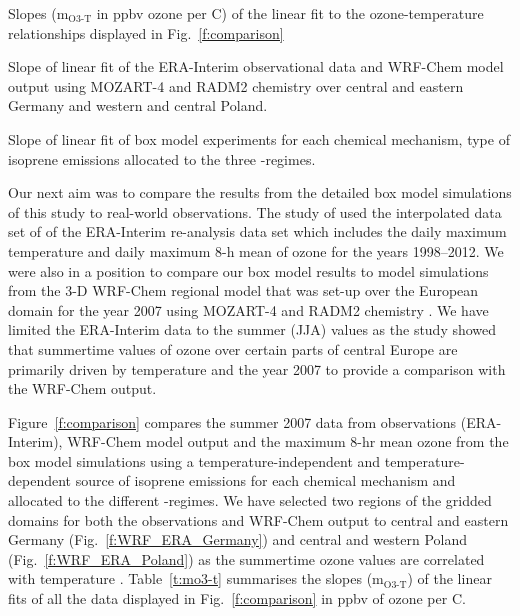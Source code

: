 \begin{table}[t]%
    \centering%
    \caption{Slopes (m$_{\text{O3-T}}$ in ppbv ozone per \degree C) of the linear fit to the ozone-temperature relationships displayed in Fig.~\ref{f:comparison}}%
    \label{t:mo3-t}%
    \begin{subtable}[t]{\textwidth}%
        \centering%
        \vspace{2mm}%
        \caption{Slope of linear fit of the ERA-Interim observational data and WRF-Chem model output using MOZART-4 and RADM2 chemistry over central and eastern Germany and western and central Poland.}%
        \label{t:era_wrf_o3-T}%
    \end{subtable}
    \begin{subtable}[t]{\textwidth}%
        \centering%
        \vspace{2mm}
        \caption{Slope of linear fit of box model experiments for each chemical mechanism, type of isoprene emissions allocated to the three -regimes.}%
        \label{t:boxmodel_o3-T}%
    \end{subtable}
\end{table} 

Our next aim was to compare the results from the detailed box model simulations of this study to real-world observations.
The study of \citet{Otero:2016} used the interpolated data set of \citet{Schnell:2015} of the ERA-Interim re-analysis data set \citep{Dee:2011} which includes the daily maximum temperature and daily maximum 8-h mean of ozone for the years 1998--2012.
We were also in a position to compare our box model results to model simulations from the 3-D WRF-Chem regional model that was set-up over the European domain for the year 2007 using MOZART-4 and RADM2 chemistry .
We have limited the ERA-Interim data to the summer (JJA) values as the \citet{Otero:2016} study showed that summertime values of ozone over certain parts of central Europe are primarily driven by temperature and the year 2007 to provide a comparison with the WRF-Chem output.

Figure~\ref{f:comparison} compares the summer 2007 data from observations (ERA-Interim), WRF-Chem model output and the maximum 8-hr mean ozone from the box model simulations using a temperature-independent and temperature-dependent source of isoprene emissions for each chemical mechanism and allocated to the different -regimes.
We have selected two regions of the gridded domains for both the observations and WRF-Chem output to central and eastern Germany (Fig.~\ref{f:WRF_ERA_Germany}) and central and western Poland (Fig.~\ref{f:WRF_ERA_Poland}) as the summertime ozone values are correlated with temperature \citep{Otero:2016}.
Table~\ref{t:mo3-t} summarises the slopes (m$_{\text{O3-T}}$) of the linear fits of all the data displayed in Fig.~\ref{f:comparison} in ppbv of ozone per \degree C.

